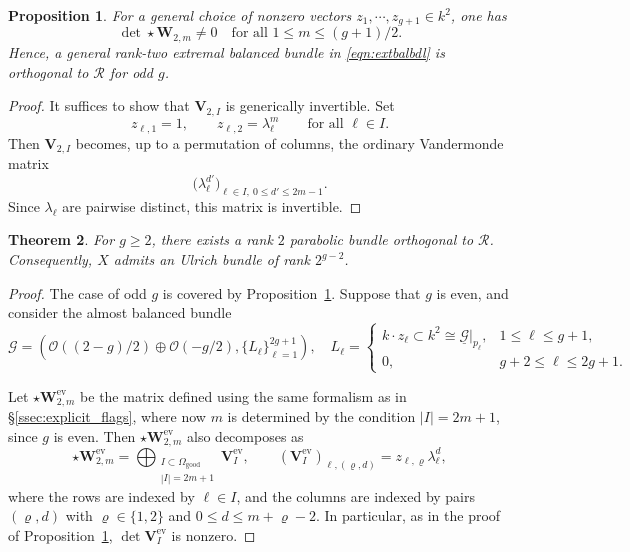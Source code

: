 \documentclass[12pt, letterpaper]{amsart}
\newtheorem{theorem}{Theorem}[section]
\newtheorem{proposition}[theorem]{Proposition}
\theoremstyle{definition}
\newcommand{\cG}{\mathcal{G} }
\newcommand{\cO}{\mathcal{O} }
\newcommand{\cR}{\mathcal{R} }
\newcommand{\bV}{\mathbf{V} }
\newcommand{\bW}{\mathbf{W} }
\newcommand{\Om}{\Omega}
\newcommand{\lbd}{\lambda}
\begin{document}
\begin{proposition}\label{prop:rank2_generic_full_rank}
For a general choice of nonzero vectors \(z_1,\cdots,z_{g+1}\in k^2\), one has
\[\det \star\bW_{2,m}\neq 0\quad\text{for all }1\le m\le (g+1)/2.\]
Hence, a general rank-two extremal balanced bundle in \eqref{eqn:extbalbdl} is orthogonal to \(\cR\) for odd \(g\).
\end{proposition}

\begin{proof}
It suffices to show that \(\bV_{2,I}\) is generically invertible. Set
\[z_{\ell,1}=1,\qquad z_{\ell,2}=\lbd_\ell^m\qquad\text{for all }\ell\in I.\]
Then \(\bV_{2,I}\) becomes, up to a permutation of columns, the ordinary Vandermonde matrix
\[\bigl(\lbd_\ell^{d'}\bigr)_{\ell\in I,\ 0\le d'\le 2m-1}.\]
Since \(\lbd_\ell\) are pairwise distinct, this matrix is invertible.
\end{proof}

\begin{theorem}\label{thm:rk2_bundle_case}
For \(g\ge2\), there exists a rank \(2\) parabolic bundle orthogonal to \(\cR\). Consequently, \(X\) admits an Ulrich bundle of rank \(2^{g-2}\).
\end{theorem}

\begin{proof}
The case of odd \(g\) is covered by Proposition~\ref{prop:rank2_generic_full_rank}. Suppose that \(g\) is even, and consider the almost balanced bundle
\[
\cG=\left(\cO\left((2-g)/2\right)\oplus\cO\left(-g/2\right),\{L_\ell\}_{\ell=1}^{2g+1}\right),\quad L_\ell= \begin{cases} k\cdot z_\ell\subset k^2\cong \underline{\cG}|_{p_\ell}, & 1\le\ell\le g+1,\\[4pt] 0, & g+2\le\ell\le 2g+1. \end{cases}
\]

Let \(\star\bW^{\mathrm{ev}}_{2,m}\) be the matrix defined using the same formalism as in \S\ref{ssec:explicit_flags}, where now \(m\) is determined by the condition \(|I|=2m+1\), since \(g\) is even. Then \(\star\bW^{\mathrm{ev}}_{2,m}\) also decomposes as
\[
\star\bW^{\mathrm{ev}}_{2,m}=\bigoplus_{\substack{I\subset\Om_{\mathrm{good}}\\|I|=2m+1}}\bV^{\mathrm{ev}}_I,\qquad(\bV^{\mathrm{ev}}_I)_{\ell,(\varrho,d)}=z_{\ell,\varrho}\lbd_\ell^d,
\]
where the rows are indexed by \(\ell\in I\), and the columns are indexed by pairs \((\varrho,d)\) with \(\varrho\in\{1,2\}\) and \(0\le d\le m+\varrho-2\). In particular, as in the proof of Proposition~\ref{prop:rank2_generic_full_rank}, \(\det \bV^{\mathrm{ev}}_I\) is nonzero.
\end{proof}
\end{document}
